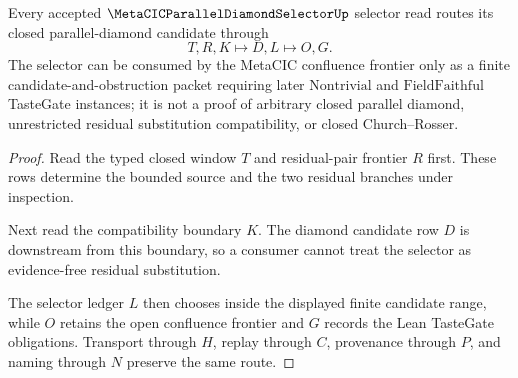 \begin{theorem}
\label{thm:metacic-parallel-diamond-selector-frontier-route}
Every accepted $\MetaCICParallelDiamondSelectorUp$ selector read routes its closed parallel-diamond candidate through
$$
T,R,K \longmapsto D,L \longmapsto O,G .
$$
The selector can be consumed by the MetaCIC confluence frontier only as a finite candidate-and-obstruction packet requiring later $\mathrm{Nontrivial}$ and $\mathrm{FieldFaithful}$ TasteGate instances; it is not a proof of arbitrary closed parallel diamond, unrestricted residual substitution compatibility, or closed Church--Rosser.
\end{theorem}
\begin{proof}
Read the typed closed window $T$ and residual-pair frontier $R$ first. These rows determine the bounded source and the two residual branches under inspection.

Next read the compatibility boundary $K$. The diamond candidate row $D$ is downstream from this boundary, so a consumer cannot treat the selector as evidence-free residual substitution.

The selector ledger $L$ then chooses inside the displayed finite candidate range, while $O$ retains the open confluence frontier and $G$ records the Lean TasteGate obligations. Transport through $H$, replay through $C$, provenance through $P$, and naming through $N$ preserve the same route.
\end{proof}



